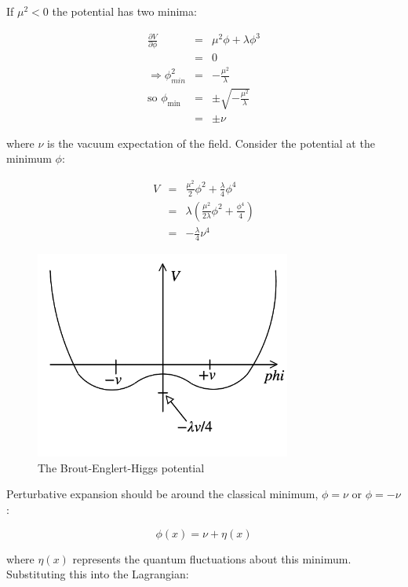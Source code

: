 If $\mu^2<0$ the potential has two minima:

\begin{eqnarray*}
  \frac{\partial V}{\partial\phi} & = & \mu^2\phi + \lambda \phi^3 \\
  & = & 0 \\
  \Rightarrow \phi^2_{min} & = & -\frac{\mu^2}{\lambda} \\
  \textrm{so } \phi_{\min} & = & \pm\sqrt{-\frac{\mu^2}{\lambda}} \\
  & = & \pm \nu
\end{eqnarray*}

where $\nu$ is the vacuum expectation of the field.  Consider the potential at the minimum $\phi$:

\begin{eqnarray*}
  V & = & \frac{\mu^2}{2}\phi^2 + \frac{\lambda}{4}\phi^4 \\
    & = & \lambda\left( \frac{\mu^2}{2\lambda}\phi^2 + \frac{\phi^4}{4}\right) \\
    & = & -\frac{\lambda}{4}\nu^4
\end{eqnarray*}

\begin{figure}[!htb]
  \begin{center}
    \includegraphics[width=0.75\textwidth]{images/web_feynman/image_83.png}
    \caption[The BEH potential]{The Brout-Englert-Higgs potential}
    \label{fig:ch16_potential}
  \end{center}
\end{figure}

Perturbative expansion should be around the classical minimum, $\phi = \nu$ or $\phi = -\nu$:

\[
  \phi(x) = \nu + \eta(x)
\]

where $\eta(x)$ represents the quantum fluctuations about this minimum.  Substituting this into the Lagrangian:

